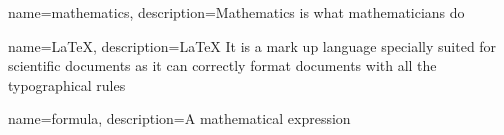 {
    name=mathematics,
    description={Mathematics is what mathematicians do}
}

{
    name=LaTeX,
    description={LaTeX It is a mark up language specially suited for scientific documents as it can correctly format documents with all the typographical rules}
}


{
    name=formula,
    description={A mathematical expression}
}